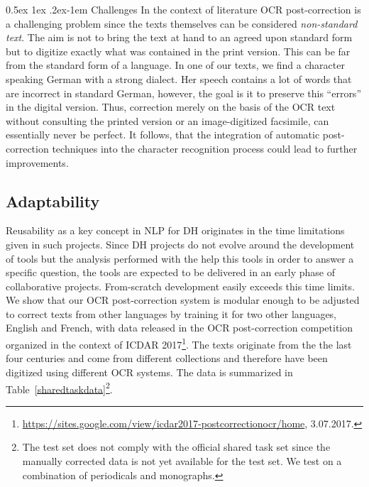 \documentclass[11pt,letterpaper]{article}
\makeatletter
\renewcommand{\paragraph}{%
  \@startsection{paragraph}{4}%
  {\z@}{0.5ex \@plus 1ex \@minus .2ex}{-1em}%
  {\normalfont\normalsize\bfseries}%
}
\makeatother
\begin{document}
\paragraph{Challenges}
In the context of literature OCR post-correction is a challenging problem since 
the texts themselves can be considered \textit{non-standard text}. The aim is not
 to bring the text at hand to an agreed upon standard form but to digitize exactly what was contained in the print version. 
 This can be far from the standard form of a language. In one of our texts, we find 
a character speaking German with a strong dialect. Her speech contains a lot of 
words that are incorrect in standard German, however, the goal is it to preserve this 
``errors'' in the digital version. Thus, correction merely on the basis of the OCR text without consulting the printed version or an image-digitized facsimile, can essentially never be perfect. It follows, that the integration of automatic post-correction techniques into the character recognition process could lead to further improvements.

\subsection{Adaptability}

Reusability as a key concept in NLP for DH originates in the time limitations given in such projects. Since DH projects do not evolve around the development of tools but the analysis performed with the help this tools in order to answer a specific question, the tools are expected to be delivered in an early phase of collaborative projects. From-scratch development easily exceeds this time limits. We show that our OCR post-correction system is modular enough to be adjusted to correct texts from other languages by training it for two other languages, English and French, with data released in the OCR post-correction competition organized in the context of ICDAR 2017\footnote{\url{https://sites.google.com/view/icdar2017-postcorrectionocr/home}, 3.07.2017.}. The texts originate from the the last four centuries and come from different collections and therefore have been digitized using different OCR systems. The data is summarized in Table~\ref{sharedtaskdata}\footnote{The test set does not comply with the official shared task set since the manually corrected data is not yet available for the test set. We test on a combination of periodicals and monographs.}.
\end{document}
